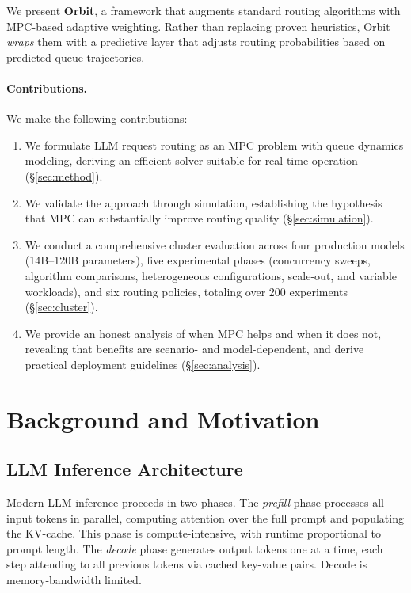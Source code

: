\documentclass[runningheads]{llncs}
\begin{document}
We present \textbf{Orbit}, a framework that augments standard routing algorithms with MPC-based adaptive weighting. Rather than replacing proven heuristics, Orbit \textit{wraps} them with a predictive layer that adjusts routing probabilities based on predicted queue trajectories.

\paragraph{Contributions.} We make the following contributions:

\begin{enumerate}
    \item We formulate LLM request routing as an MPC problem with queue dynamics modeling, deriving an efficient solver suitable for real-time operation (\S\ref{sec:method}).
    
    \item We validate the approach through simulation, establishing the hypothesis that MPC can substantially improve routing quality (\S\ref{sec:simulation}).
    
    \item We conduct a comprehensive cluster evaluation across four production models (14B--120B parameters), five experimental phases (concurrency sweeps, algorithm comparisons, heterogeneous configurations, scale-out, and variable workloads), and six routing policies, totaling over 200 experiments (\S\ref{sec:cluster}).
    
    \item We provide an honest analysis of when MPC helps and when it does not, revealing that benefits are scenario- and model-dependent, and derive practical deployment guidelines (\S\ref{sec:analysis}).
\end{enumerate}

\section{Background and Motivation}
\label{sec:background}

\subsection{LLM Inference Architecture}

Modern LLM inference proceeds in two phases. The \textit{prefill} phase processes all input tokens in parallel, computing attention over the full prompt and populating the KV-cache. This phase is compute-intensive, with runtime proportional to prompt length. The \textit{decode} phase generates output tokens one at a time, each step attending to all previous tokens via cached key-value pairs. Decode is memory-bandwidth limited.
\end{document}
